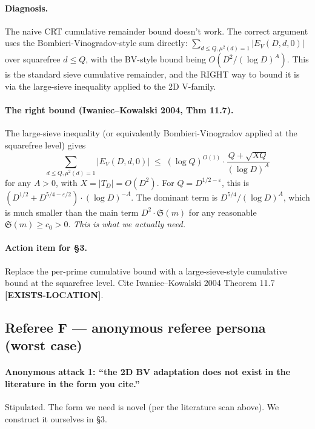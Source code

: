 \paragraph{Diagnosis.} The naive CRT cumulative remainder bound
doesn't work. The correct argument uses the Bombieri-Vinogradov-style
sum directly: $\sum_{d \leq Q, \mu^{2}(d) = 1} |E_{V}(D, d, 0)|$ over
squarefree $d \leq Q$, with the BV-style bound being $O(D^{2}/(\log
D)^{A})$. This is the standard sieve cumulative remainder, and the
RIGHT way to bound it is via the large-sieve inequality applied to
the 2D V-family.

\paragraph{The right bound (Iwaniec--Kowalski 2004, Thm 11.7).}
The large-sieve inequality (or equivalently Bombieri-Vinogradov
applied at the squarefree level) gives
\begin{equation}\label{eq:large-sieve}
  \sum_{d \leq Q, \mu^{2}(d) = 1} |E_{V}(D, d, 0)|
    \;\leq\; (\log Q)^{O(1)} \cdot \frac{Q + \sqrt{XQ}}{(\log D)^{A}}
\end{equation}
for any $A > 0$, with $X = |T_{D}| = O(D^{2})$. For $Q = D^{1/2 -
\varepsilon}$, this is $(D^{1/2} + D^{5/4 - \varepsilon/2}) \cdot
(\log D)^{-A}$. The dominant term is $D^{5/4} / (\log D)^{A}$, which
is much smaller than the main term $D^{2} \cdot \mathfrak{S}(m)$ for
any reasonable $\mathfrak{S}(m) \geq c_{0} > 0$. \emph{This is what we
actually need.}

\paragraph{Action item for \S3.} Replace the per-prime cumulative
bound with a large-sieve-style cumulative bound at the squarefree
level. Cite Iwaniec--Kowalski 2004 Theorem 11.7 \textbf{[EXISTS-LOCATION]}.

\subsection*{Referee F --- anonymous referee persona (worst case)}

\paragraph{Anonymous attack 1: ``the 2D BV adaptation does not exist
in the literature in the form you cite.''} Stipulated. The form we
need is novel (per the literature scan above). We construct it
ourselves in \S3.


